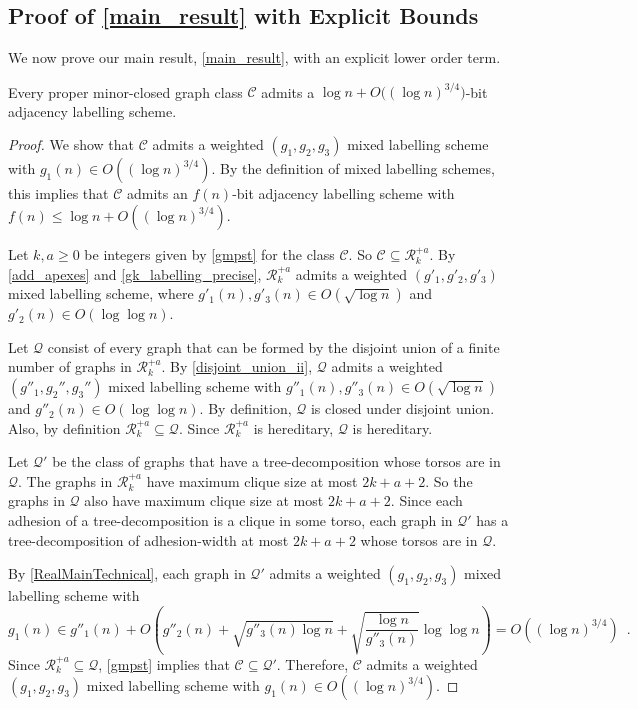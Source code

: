 \documentclass{patmorin}
\renewcommand{\le}{\leqslant}
\renewcommand{\geq}{\geqslant}
\newcommand{\Oh}{O}
\begin{document}
\subsection{Proof of \texorpdfstring{\cref{main_result}}{Theorem \ref*{main_result}} with Explicit Bounds}

We now prove our main result, \cref{main_result}, with an explicit lower order term.

\begin{lem}
  \label{main_result_detailed}
  Every proper minor-closed graph class $\mathcal{C}$  admits a $\log n + \Oh\big((\log n)^{3/4}\big)$-bit adjacency labelling scheme.
\end{lem}

\begin{proof}
  We show that $\mathcal{C}$ admits a weighted $(g_1,g_2,g_3)$ mixed labelling scheme with $g_1(n) \in \Oh((\log n)^{3/4})$. By the definition of mixed labelling schemes, this implies that $\mathcal{C}$ admits an $f(n)$-bit adjacency labelling scheme with $f(n)\le\log n + \Oh((\log n)^{3/4})$.

  Let $k,a\geq 0$ be integers given by \cref{gmpst} for the class $\mathcal{C}$. So $\mathcal{C}\subseteq \mathcal{R}_k^{+a}$. By \cref{add_apexes} and \cref{gk_labelling_precise}, $\mathcal{R}_k^{+a}$ admits a weighted $(g'_1,g'_2,g'_3)$ mixed labelling scheme, where $g'_1(n),g'_3(n)\in \Oh(\sqrt{\log n})$ and $g'_2(n)\in \Oh(\log\log n)$.

  Let $\mathcal{Q}$ consist of every graph that can be formed by the disjoint union of a finite number of graphs in $\mathcal{R}_k^{+a}$.  By \cref{disjoint_union_ii}, $\mathcal{Q}$ admits a weighted $(g''_1,g_2'',g_3'')$ mixed labelling scheme with $g''_1(n),g''_3(n)\in \Oh(\sqrt{\log n})$ and $g''_2(n)\in \Oh(\log\log n)$.   By definition, $\mathcal{Q}$ is closed under disjoint union.  Also, by definition  $\mathcal{R}_k^{+a}\subseteq\mathcal{Q}$. Since $\mathcal{R}_k^{+a}$ is hereditary, $\mathcal{Q}$ is hereditary.

  Let $\mathcal{Q}'$ be the class of graphs that have a tree-decomposition whose torsos are in $\mathcal{Q}$.  The graphs in $\mathcal{R}_k^{+a}$ have maximum clique size at most $2k+a+2$.  So the graphs in $\mathcal{Q}$ also have maximum clique size at most $2k+a+2$. Since each adhesion of a tree-decomposition is a clique in some torso,   each graph in $\mathcal{Q}'$ has a tree-decomposition 
  of adhesion-width at most $2k+a+2$ whose torsos are in $\mathcal{Q}$.

  By \cref{RealMainTechnical}, each graph in $\mathcal{Q}'$ admits a weighted $(g_1,g_2,g_3)$ mixed labelling scheme with
  \[
    g_1(n) \in g''_1(n) + \Oh\left(g''_2(n) + \sqrt{g''_3(n)\log n}
    + \sqrt{\frac{\log n}{g''_3(n)}}\log\log n\right) = \Oh((\log n)^{3/4}) \enspace.
  \]
  Since $\mathcal{R}_k^{+a}\subseteq\mathcal{Q}$, \cref{gmpst} implies that $\mathcal{C}\subseteq\mathcal{Q}'$.  Therefore, $\mathcal{C}$ admits a weighted $(g_1,g_2,g_3)$ mixed labelling scheme with $g_1(n)\in \Oh((\log n)^{3/4})$.
\end{proof}
\end{document}
